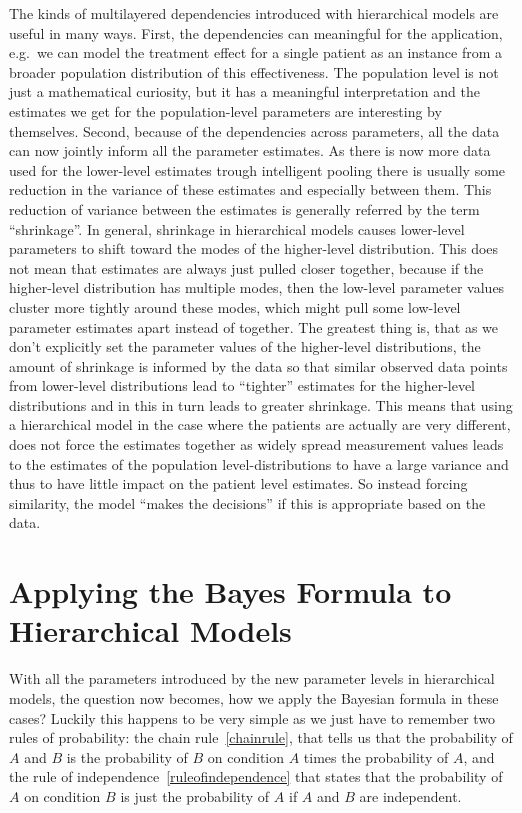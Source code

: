 \documentclass[12pt,a4paper,leqno]{report}
\theoremstyle{plain}
\theoremstyle{definition}
\theoremstyle{remark}
\begin{document}
The kinds of multilayered dependencies introduced with hierarchical models are useful in many ways.
First, the dependencies can meaningful for the application, e.g.\ we can
model the treatment effect for a single patient as an instance from a
broader population distribution of this effectiveness. The population level is not just
a mathematical curiosity, but it has a meaningful interpretation and the estimates we
get for the population-level parameters are interesting by themselves. Second, because
of the dependencies across parameters, all the data can now jointly inform all the
parameter estimates. As there is now more data used for the lower-level estimates trough
intelligent pooling there is usually some reduction in the variance of these estimates
and especially between them. This reduction of variance between the estimates is
generally referred by the term ``shrinkage''. In general,
shrinkage in hierarchical models causes lower-level parameters to shift toward the modes
of the higher-level distribution. This does not mean that
estimates are always just pulled closer together, because if the higher-level
distribution has multiple modes, then the low-level parameter values cluster
more tightly around these modes, which might pull some
low-level parameter estimates apart instead of together. The greatest thing
is, that as we don't explicitly set the parameter values of the higher-level
distributions, the amount of shrinkage is informed by the data so that
similar observed data points from lower-level distributions lead to ``tighter''
estimates for the higher-level distributions and in this in turn leads to
greater shrinkage. This means that using a hierarchical model in the case where the
patients are actually are very different, does not force the estimates together as
widely spread measurement values leads to the estimates of the population level-distributions to
have a large variance and thus to have little impact on the patient level estimates. So
instead forcing similarity, the model ``makes the decisions'' if this is appropriate
based on the data.

\section{Applying the Bayes Formula to Hierarchical Models}

With all the parameters introduced by the new parameter levels in hierarchical models, the question now becomes, how we apply
the Bayesian formula in these cases? Luckily this happens to be very simple as we just
have to remember two rules of probability: the chain rule\ \ref{chainrule}, that
tells us that the probability of $A$ and $B$ is the probability of $B$ on condition $A$
times the probability of $A$, and the rule of independence\ \ref{ruleofindependence} that states that the
probability of $A$ on condition $B$ is just the probability of $A$ if $A$ and $B$ are independent.
\end{document}

